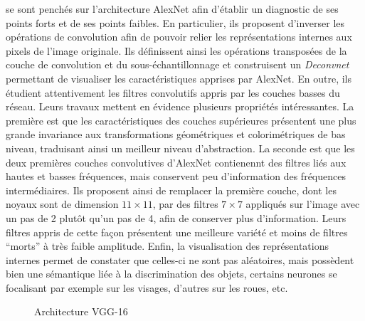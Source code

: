 \citet{zeiler_visualizing_2014} se sont penchés sur l'architecture AlexNet afin d'établir un diagnostic de ses points forts et de ses points faibles. En particulier, ils proposent d'inverser les opérations de convolution afin de pouvoir relier les représentations internes aux pixels de l'image originale. Ils définissent ainsi les opérations transposées de la couche de convolution et du sous-échantillonnage et construisent un \emph{Deconvnet} permettant de visualiser les caractéristiques apprises par AlexNet. En outre, ils étudient attentivement les filtres convolutifs appris par les couches basses du réseau. Leurs travaux mettent en évidence plusieurs propriétés intéressantes. La première est que les caractéristiques des couches supérieures présentent une plus grande invariance aux transformations géométriques et colorimétriques de bas niveau, traduisant ainsi un meilleur niveau d'abstraction. La seconde est que les deux premières couches convolutives d'AlexNet contienennt des filtres liés aux hautes et basses fréquences, mais conservent peu d'information des fréquences intermédiaires. Ils proposent ainsi de remplacer la première couche, dont les noyaux sont de dimension $11\times11$, par des filtres $7\times7$ appliqués sur l'image avec un pas de 2 plutôt qu'un pas de 4, afin de conserver plus d'information. Leurs filtres appris de cette façon présentent une meilleure variété et moins de filtres ``morts'' à très faible amplitude. Enfin, la visualisation des représentations internes permet de constater que celles-ci ne sont pas aléatoires, mais possèdent bien une sémantique liée à la discrimination des objets, certains neurones se focalisant par exemple sur les visages, d'autres sur les roues, etc.

\begin{figure}[t]
  \resizebox{\textwidth}{!}{
    
  }
  \caption{Architecture VGG-16~\cite{simonyan_very_2014}}
  \label{fig:vgg}
\end{figure}

